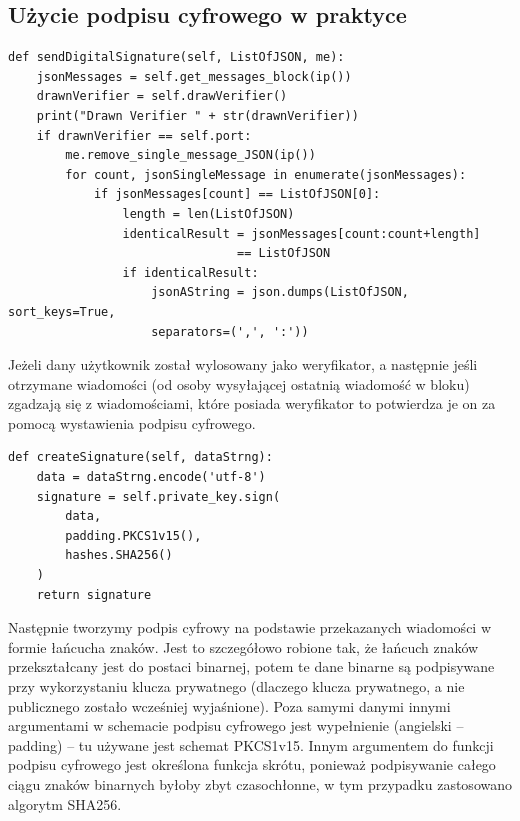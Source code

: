 \subsection{Użycie podpisu cyfrowego w praktyce}
\label{sec:PodpisCyfrowyPraktyka}
\begin{lstlisting}
def sendDigitalSignature(self, ListOfJSON, me):
    jsonMessages = self.get_messages_block(ip())
    drawnVerifier = self.drawVerifier()
    print("Drawn Verifier " + str(drawnVerifier))
    if drawnVerifier == self.port:
        me.remove_single_message_JSON(ip())
        for count, jsonSingleMessage in enumerate(jsonMessages):
            if jsonMessages[count] == ListOfJSON[0]:
                length = len(ListOfJSON)
                identicalResult = jsonMessages[count:count+length]
                                == ListOfJSON
                if identicalResult:
                    jsonAString = json.dumps(ListOfJSON, sort_keys=True,
                    separators=(',', ':'))
\end{lstlisting}
Jeżeli dany użytkownik został wylosowany jako weryfikator, a następnie jeśli otrzymane wiadomości (od osoby wysyłającej ostatnią wiadomość w bloku) zgadzają się z wiadomościami, które posiada weryfikator to potwierdza je on za pomocą wystawienia podpisu cyfrowego.
\begin{lstlisting}
def createSignature(self, dataStrng):
    data = dataStrng.encode('utf-8')
    signature = self.private_key.sign(
        data,
        padding.PKCS1v15(),
        hashes.SHA256()
    )
    return signature
\end{lstlisting}
Następnie tworzymy podpis cyfrowy na podstawie przekazanych wiadomości w formie łańcucha znaków. Jest to szczegółowo robione tak, że łańcuch znaków przekształcany jest do postaci binarnej, potem te dane binarne są podpisywane przy wykorzystaniu klucza prywatnego (dlaczego klucza prywatnego, a nie publicznego zostało wcześniej wyjaśnione). Poza samymi danymi innymi argumentami w schemacie podpisu cyfrowego jest wypełnienie (angielski – padding) – tu używane jest schemat PKCS1v15. Innym argumentem do funkcji podpisu cyfrowego jest określona funkcja skrótu, ponieważ podpisywanie całego ciągu znaków binarnych byłoby zbyt czasochłonne, w tym przypadku zastosowano algorytm SHA256.

\vspace{1em}


